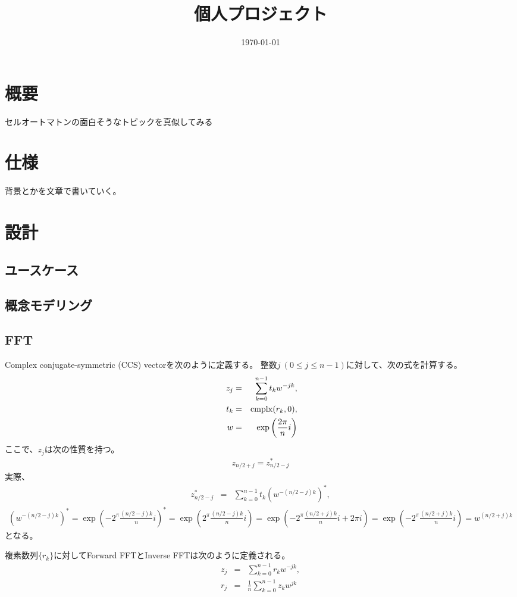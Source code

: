 \documentclass[a4j,12pt]{jreport}
\title{個人プロジェクト}
\date{\today}
\begin{document}
\maketitle

\chapter{概要}
セルオートマトンの面白そうなトピックを真似してみる

\chapter{仕様}
背景とかを文章で書いていく。

\chapter{設計}
\section{ユースケース}
\section{概念モデリング}

\appendix

\section{FFT}

Complex conjugate-symmetric (CCS) vectorを次のように定義する。
整数$j\ (0\leq j \leq n-1)$に対して、次の式を計算する。
\begin{eqnarray}
    z_j &=& \sum_{k=0}^{n-1} t_k w^{-j k},\\\
    t_k &=& {\rm cmplx}(r_k,0),\\
    w &=& \exp\left(\frac{2\pi}{n}i\right)
\end{eqnarray}
ここで、$z_j$は次の性質を持つ。
\begin{eqnarray}
    z_{n/2 + j} = z_{n/2-j}^*
\end{eqnarray}
実際、
\begin{eqnarray}
    z_{n/2-j}^* &=& \sum_{k=0}^{n-1}t_k (w^{-(n/2-j)k})^*,
\end{eqnarray}
\begin{eqnarray}
    (w^{-(n/2-j)k})^* = \exp\left(-2^\pi\frac{(n/2-j)k}{n}i\right)^*
    = \exp\left(2^\pi\frac{(n/2-j)k}{n}i\right)
    = \exp\left(-2^\pi\frac{(n/2+j)k}{n}i+2\pi i\right)
    = \exp\left(-2^\pi\frac{(n/2+j)k}{n}i\right)
    = w^{(n/2+j)k}
\end{eqnarray}
となる。

複素数列$\{r_k\}$に対してForward FFTとInverse FFTは次のように定義される。
\begin{eqnarray}
    z_j &=& \sum_{k=0}^{n-1}r_k w^{-jk},\\
    r_j &=& \frac{1}{n}\sum_{k=0}^{n-1}z_k w^{jk}
\end{eqnarray}
\end{document}
